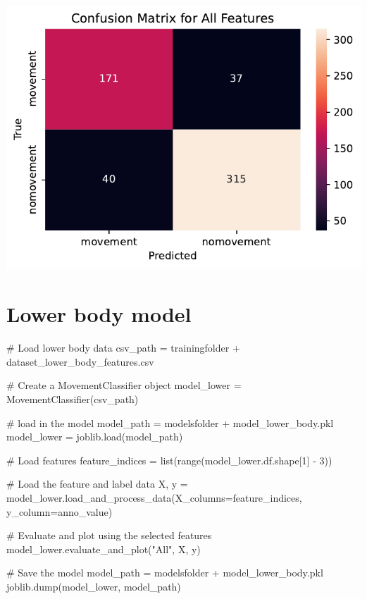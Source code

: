 \documentclass[
  letterpaper,
  DIV=11,
  numbers=noendperiod]{scrreprt}
\newenvironment{Shaded}{\begin{snugshade}}{\end{snugshade}}
\newcommand{\BuiltInTok}[1]{\textcolor[rgb]{0.00,0.23,0.31}{#1}}
\newcommand{\CommentTok}[1]{\textcolor[rgb]{0.37,0.37,0.37}{#1}}
\newcommand{\DecValTok}[1]{\textcolor[rgb]{0.68,0.00,0.00}{#1}}
\newcommand{\NormalTok}[1]{\textcolor[rgb]{0.00,0.23,0.31}{#1}}
\newcommand{\OperatorTok}[1]{\textcolor[rgb]{0.37,0.37,0.37}{#1}}
\newcommand{\StringTok}[1]{\textcolor[rgb]{0.13,0.47,0.30}{#1}}
\begin{document}
\includegraphics{04_TS_movementAnnotation/02_MovementClassifier_final_files/figure-pdf/cell-6-output-2.pdf}

\section{Lower body model}\label{lower-body-model}

\begin{Shaded}
\begin{Highlighting}[]
\CommentTok{\# Load lower body data}
\NormalTok{csv\_path }\OperatorTok{=}\NormalTok{ trainingfolder }\OperatorTok{+} \StringTok{\textquotesingle{}dataset\_lower\_body\_features.csv\textquotesingle{}}

\CommentTok{\# Create a MovementClassifier object}
\NormalTok{model\_lower }\OperatorTok{=}\NormalTok{ MovementClassifier(csv\_path)}

\CommentTok{\# load in the model}
\NormalTok{model\_path }\OperatorTok{=}\NormalTok{ modelsfolder }\OperatorTok{+} \StringTok{\textquotesingle{}model\_lower\_body.pkl\textquotesingle{}}
\NormalTok{model\_lower }\OperatorTok{=}\NormalTok{ joblib.load(model\_path)}

\CommentTok{\# Load features}
\NormalTok{feature\_indices }\OperatorTok{=} \BuiltInTok{list}\NormalTok{(}\BuiltInTok{range}\NormalTok{(model\_lower.df.shape[}\DecValTok{1}\NormalTok{] }\OperatorTok{{-}} \DecValTok{3}\NormalTok{))}

\CommentTok{\# Load the feature and label data}
\NormalTok{X, y }\OperatorTok{=}\NormalTok{ model\_lower.load\_and\_process\_data(X\_columns}\OperatorTok{=}\NormalTok{feature\_indices, y\_column}\OperatorTok{=}\StringTok{\textquotesingle{}anno\_value\textquotesingle{}}\NormalTok{)}

\CommentTok{\# Evaluate and plot using the selected features}
\NormalTok{model\_lower.evaluate\_and\_plot(}\StringTok{"All"}\NormalTok{, X, y)}

\CommentTok{\# Save the model}
\NormalTok{model\_path }\OperatorTok{=}\NormalTok{ modelsfolder }\OperatorTok{+} \StringTok{\textquotesingle{}model\_lower\_body.pkl\textquotesingle{}}
\NormalTok{joblib.dump(model\_lower, model\_path)}
\end{Highlighting}
\end{Shaded}
\end{document}
